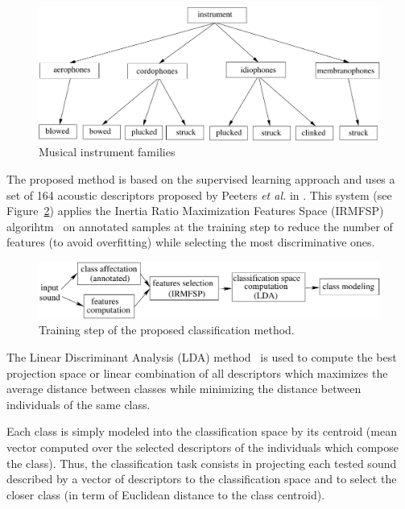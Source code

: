 \documentclass{sig-alternate}
\begin{document}
\begin{figure}[htb]
  \centering
  \includegraphics[width=0.9\linewidth]{img/taxonomie_diadems.pdf}
  \caption{Musical instrument families}
  \label{fig:instruments}
\end{figure}


The proposed method is based on the supervised learning approach and uses a set of 164 acoustic descriptors 
proposed by Peeters \textit{et al.} in \cite{timbre_toolbox}.
This system (see Figure~\ref{fig:inst_classif_method}) applies the Inertia Ratio Maximization Features Space (IRMFSP) algorihtm~\cite{aes_irmfsp} 
on annotated samples at the training step to reduce the number of features (to avoid overfitting) while selecting the most discriminative ones. %

\begin{figure}[htb]
 \centering\includegraphics[width=0.9\linewidth]{img/method}
 \caption{Training step of the proposed classification method.}
 \label{fig:inst_classif_method}
\end{figure}

The Linear Discriminant Analysis (LDA) method~\cite{lda_book} is used to compute the best projection space 
or linear combination of all descriptors which maximizes the average distance between classes while minimizing the 
distance between individuals of the same class.

Each class is simply modeled into the classification space by its centroid (mean vector computed over the selected descriptors of the individuals which compose the class).
Thus, the classification task consists in projecting each tested sound described by a vector of descriptors
to the classification space and to select the closer class (in term of Euclidean distance to the class centroid). 
\end{document}
